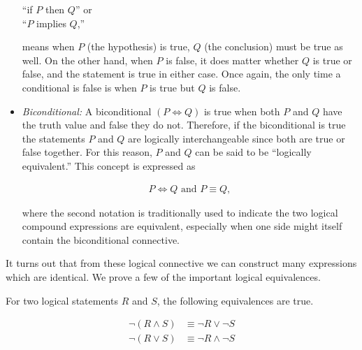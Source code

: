 \documentclass{report}
\begin{document}
\begin{itemize}
	\vspace{\baselineskip}
	\begin{center}
			``if $P$ then $Q$'' or \\
			``$P$ implies $Q$,''
	\end{center}
	\vspace{\baselineskip}
	
	  means when $P$ (the hypothesis) is true, $Q$ (the conclusion) must be true as well. On the other hand, when $P$ is false, it does matter whether $Q$ is true or false, and the statement is true in either case. Once again, the only time a conditional is false is when $P$ is true but $Q$ is false.
	  
	  \item \emph{Biconditional:} A biconditional $(P \iff Q)$ is true when both $P$ and $Q$ have the truth value and false they do not. Therefore, if the biconditional is true the statements $P$ and $Q$ are logically interchangeable since both are true or false together. For this reason, $P$ and $Q$ can be said to be ``logically equivalent.'' This concept is expressed as
	  	  
	  \begin{align*}
	  	P \iff Q \text{ and } P \equiv Q,
	  \end{align*}
	  
	  where the second notation is traditionally used to indicate the two logical compound expressions are equivalent, especially when one side might itself contain the biconditional connective.
\end{itemize}

It turns out that from these logical connective we can construct many expressions which are identical. We prove a few of the important logical equivalences. \\

\begin{theorem}
	For two logical statements $R$ and $S$, the following equivalences are true.
	
	\begin{align}
		\neg(R \wedge S) &\equiv \neg R \lor \neg S \\
		\neg(R \lor S) &\equiv \neg R \wedge \neg S
	\end{align}
\end{theorem}
\end{document}
